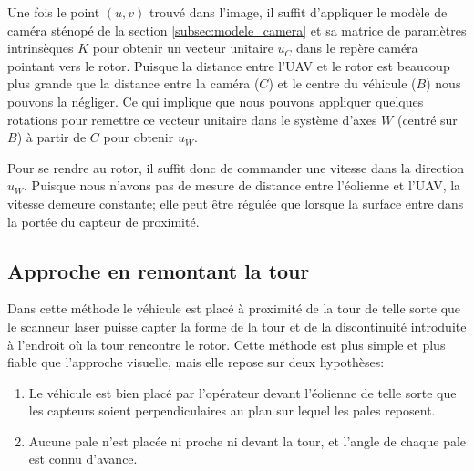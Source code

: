 Une fois le point $(u,v)$ trouvé dans l'image, il suffit d'appliquer le modèle de caméra sténopé de la section \ref{subsec:modele_camera} et sa matrice de paramètres intrinsèques $K$ pour obtenir un vecteur unitaire $u_C$ dans le repère caméra pointant vers le rotor. Puisque la distance entre l'UAV et le rotor est beaucoup plus grande que la distance entre la caméra ($C$) et le centre du véhicule ($B$) nous pouvons la négliger. Ce qui implique que nous pouvons appliquer quelques rotations pour remettre ce vecteur unitaire dans le système d'axes $W$ (centré sur $B$) à partir de $C$ pour obtenir $u_W$.

Pour se rendre au rotor, il suffit donc de commander une vitesse dans la direction $u_W$. Puisque nous n'avons pas de mesure de distance entre l'éolienne et l'UAV, la vitesse demeure constante; elle peut être régulée que lorsque la surface entre dans la portée du capteur de proximité.

\subsection{Approche en remontant la tour}
\label{subsec:laser_tower}

Dans cette méthode le véhicule est placé à proximité de la tour de telle sorte que le scanneur laser puisse capter la forme de la tour et de la discontinuité introduite à l'endroit où la tour rencontre le rotor. Cette méthode est plus simple et plus fiable que l'approche visuelle, mais elle repose sur deux hypothèses:
\begin{enumerate}
  \item Le véhicule est bien placé par l'opérateur devant l'éolienne de telle sorte que les capteurs soient perpendiculaires au plan sur lequel les pales reposent.
  \item Aucune pale n'est placée ni proche ni devant la tour, et l'angle de chaque pale est connu d'avance.
\end{enumerate}

